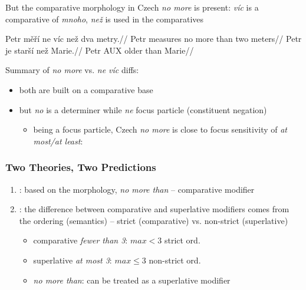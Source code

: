 \documentclass[10pt
]{beamer}
\begin{document}
\begin{frame}

But the comparative morphology in Czech \textit{no more} is present: \textit{víc} is a comparative of \textit{mnoho}, \textit{než} is used in the comparatives


\pex \a 
\begingl
\gla Petr měří ne víc než dva metry.//
\glb Petr measures no more than two meters//
\endgl
\a  
\begingl
\gla Petr je starší než Marie.//
\glb Petr AUX older than Marie//
\endgl
\xe

Summary of \textit{no more} vs. \textit{ne víc} diffs: 

\begin{itemize}
  \item both are built on a comparative base
  \item but \textit{no} is a determiner while \textit{ne} focus particle (constituent negation)
  
  \begin{itemize}
    \item being a focus particle, Czech \textit{no more} is close to focus sensitivity of \textit{at most/at least}: \cite{cohen2011superlative,coppock2013raising}
  \end{itemize}

\end{itemize}
 

\end{frame}

\begin{frame}
  \frametitle{Two Theories, Two Predictions}

\begin{enumerate}
  \item \cite{nouwen2008upper,nouwen2010two}: based on the morphology, \textit{no more than} -- comparative modifier
  \item \cite{kennedy2015fregean}: the difference between comparative and superlative modifiers comes from the ordering (semantics) -- strict (comparative) vs. non-strict (superlative)
  \begin{itemize}
    \item comparative \textit{fewer than 3}: $max < 3$ \hfill strict ord.
    \item superlative \textit{at most 3}: $max \leq 3$ \hfill non-strict ord.
    \item \textit{no more than}: can be treated as a superlative modifier
  \end{itemize}
\end{enumerate}  
  

\end{frame}
\end{document}
